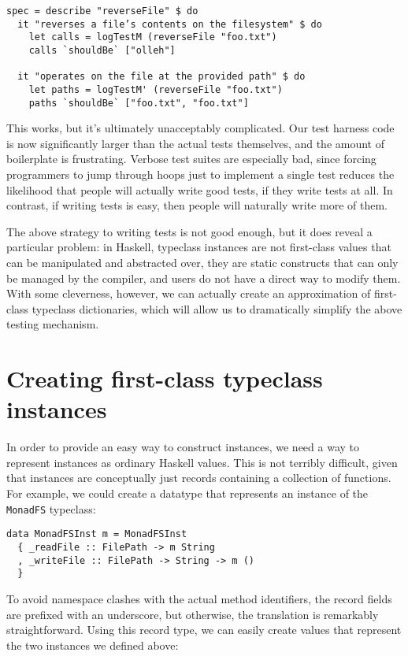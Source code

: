 \begin{verbatim}
spec = describe "reverseFile" $ do
  it "reverses a file’s contents on the filesystem" $ do
    let calls = logTestM (reverseFile "foo.txt")
    calls `shouldBe` ["olleh"]

  it "operates on the file at the provided path" $ do
    let paths = logTestM' (reverseFile "foo.txt")
    paths `shouldBe` ["foo.txt", "foo.txt"]
\end{verbatim}
This works, but it's ultimately unacceptably complicated. Our test
harness code is now significantly larger than the actual tests
themselves, and the amount of boilerplate is frustrating. Verbose test
suites are especially bad, since forcing programmers to jump through
hoops just to implement a single test reduces the likelihood that people
will actually write good tests, if they write tests at all. In contrast,
if writing tests is easy, then people will naturally write more of them.

The above strategy to writing tests is not good enough, but it does
reveal a particular problem: in Haskell, typeclass instances are not
first-class values that can be manipulated and abstracted over, they are
static constructs that can only be managed by the compiler, and users do
not have a direct way to modify them. With some cleverness, however, we
can actually create an approximation of first-class typeclass
dictionaries, which will allow us to dramatically simplify the above
testing mechanism.

\section{Creating first-class typeclass
instances}\label{creating-first-class-typeclass-instances}

In order to provide an easy way to construct instances, we need a way to
represent instances as ordinary Haskell values. This is not terribly
difficult, given that instances are conceptually just records containing
a collection of functions. For example, we could create a datatype that
represents an instance of the \texttt{MonadFS} typeclass:

\begin{verbatim}
data MonadFSInst m = MonadFSInst
  { _readFile :: FilePath -> m String
  , _writeFile :: FilePath -> String -> m ()
  }
\end{verbatim}
To avoid namespace clashes with the actual method identifiers, the
record fields are prefixed with an underscore, but otherwise, the
translation is remarkably straightforward. Using this record type, we
can easily create values that represent the two instances we defined
above:

